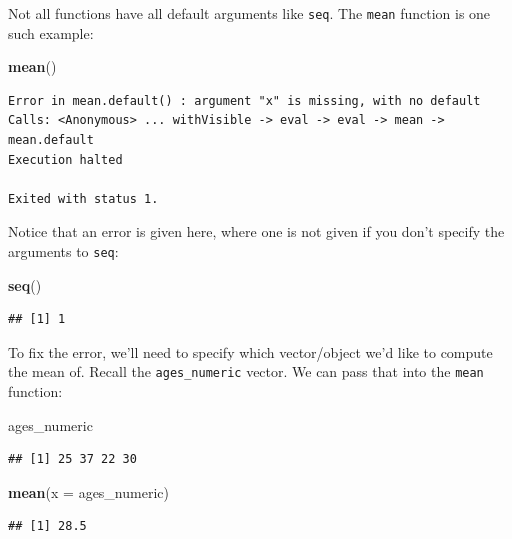 \documentclass[]{tufte-book}
\newenvironment{Shaded}{\begin{snugshade}}{\end{snugshade}}
\newcommand{\KeywordTok}[1]{\textcolor[rgb]{0.13,0.29,0.53}{\textbf{{#1}}}}
\newcommand{\DataTypeTok}[1]{\textcolor[rgb]{0.13,0.29,0.53}{{#1}}}
\newcommand{\NormalTok}[1]{{#1}}
\begin{document}
Not all functions have all default arguments like \texttt{seq}. The
\texttt{mean} function is one such example:

\begin{Shaded}
\begin{Highlighting}[]
\KeywordTok{mean}\NormalTok{()}
\end{Highlighting}
\end{Shaded}

\begin{verbatim}
Error in mean.default() : argument "x" is missing, with no default
Calls: <Anonymous> ... withVisible -> eval -> eval -> mean -> mean.default
Execution halted

Exited with status 1.
\end{verbatim}

Notice that an error is given here, where one is not given if you don't
specify the arguments to \texttt{seq}:

\begin{Shaded}
\begin{Highlighting}[]
\KeywordTok{seq}\NormalTok{()}
\end{Highlighting}
\end{Shaded}

\begin{verbatim}
## [1] 1
\end{verbatim}

To fix the error, we'll need to specify which vector/object we'd like to
compute the mean of. Recall the \texttt{ages\_numeric} vector. We can
pass that into the \texttt{mean} function:

\begin{Shaded}
\begin{Highlighting}[]
\NormalTok{ages_numeric}
\end{Highlighting}
\end{Shaded}

\begin{verbatim}
## [1] 25 37 22 30
\end{verbatim}

\begin{Shaded}
\begin{Highlighting}[]
\KeywordTok{mean}\NormalTok{(}\DataTypeTok{x =} \NormalTok{ages_numeric)}
\end{Highlighting}
\end{Shaded}

\begin{verbatim}
## [1] 28.5
\end{verbatim}
\end{document}
